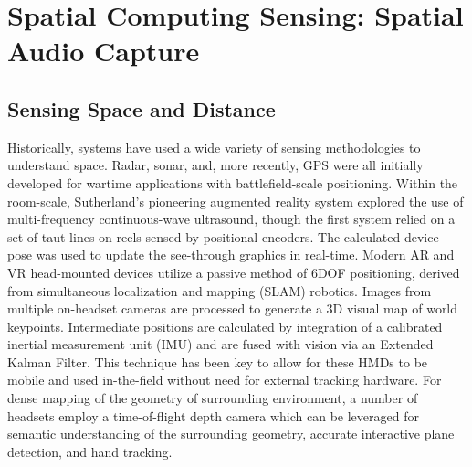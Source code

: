 \documentclass [11pt, proquest] {uwthesis}[2020/02/24]
\begin{document}














\section{Spatial Computing Sensing: Spatial Audio Capture} 

\subsection{Sensing Space and Distance}

Historically, systems have used a wide variety of sensing methodologies to understand space. Radar, sonar, and, more recently, GPS were all initially developed for wartime applications with battlefield-scale positioning. Within the room-scale, Sutherland's pioneering augmented reality system explored the use of multi-frequency continuous-wave ultrasound, though the first system relied on a set of taut lines on reels sensed by positional encoders. The calculated device pose was used to update the see-through graphics in real-time. Modern AR and VR head-mounted devices utilize a passive method of 6DOF positioning, derived from simultaneous localization and mapping (SLAM) robotics. Images from multiple on-headset cameras are processed to generate a 3D visual map of world keypoints. Intermediate positions are calculated by integration of a calibrated inertial measurement unit (IMU) and are fused with vision via an Extended Kalman Filter. This technique has been key to allow for these HMDs to be mobile and used in-the-field without need for external tracking hardware. For dense mapping of the geometry of surrounding environment, a number of headsets employ a time-of-flight depth camera which can be leveraged for semantic understanding of the surrounding geometry, accurate interactive plane detection, and hand tracking. %
\end{document}
